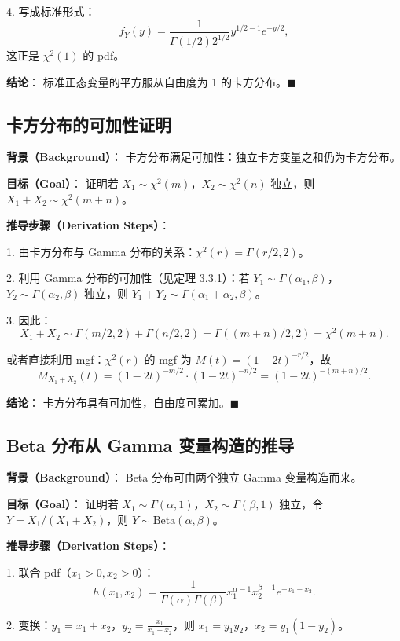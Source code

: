 4. 写成标准形式：
\[
f_Y(y) = \frac{1}{\Gamma(1/2) 2^{1/2}} y^{1/2 - 1} e^{-y/2},
\]
这正是 $\chi^2(1)$ 的 pdf。

\textbf{结论}：
标准正态变量的平方服从自由度为 1 的卡方分布。$\blacksquare$

\subsection{卡方分布的可加性证明}\label{sec:chi-square-additivity}

\textbf{背景（Background）}：
卡方分布满足可加性：独立卡方变量之和仍为卡方分布。

\textbf{目标（Goal）}：
证明若 $X_1 \sim \chi^2(m)$，$X_2 \sim \chi^2(n)$ 独立，则 $X_1 + X_2 \sim \chi^2(m+n)$。

\textbf{推导步骤（Derivation Steps）}：

1. 由卡方分布与 Gamma 分布的关系：$\chi^2(r) = \Gamma(r/2, 2)$。

2. 利用 Gamma 分布的可加性（见定理 3.3.1）：若 $Y_1 \sim \Gamma(\alpha_1, \beta)$，$Y_2 \sim \Gamma(\alpha_2, \beta)$ 独立，则 $Y_1 + Y_2 \sim \Gamma(\alpha_1 + \alpha_2, \beta)$。

3. 因此：
\[
X_1 + X_2 \sim \Gamma(m/2, 2) + \Gamma(n/2, 2) = \Gamma((m+n)/2, 2) = \chi^2(m+n).
\]

或者直接利用 mgf：$\chi^2(r)$ 的 mgf 为 $M(t) = (1-2t)^{-r/2}$，故
\[
M_{X_1+X_2}(t) = (1-2t)^{-m/2} \cdot (1-2t)^{-n/2} = (1-2t)^{-(m+n)/2}.
\]

\textbf{结论}：
卡方分布具有可加性，自由度可累加。$\blacksquare$

\subsection{Beta 分布从 Gamma 变量构造的推导}\label{sec:beta-from-gamma}

\textbf{背景（Background）}：
Beta 分布可由两个独立 Gamma 变量构造而来。

\textbf{目标（Goal）}：
证明若 $X_1 \sim \Gamma(\alpha, 1)$，$X_2 \sim \Gamma(\beta, 1)$ 独立，令 $Y = X_1/(X_1 + X_2)$，则 $Y \sim \text{Beta}(\alpha, \beta)$。

\textbf{推导步骤（Derivation Steps）}：

1. 联合 pdf（$x_1 > 0, x_2 > 0$）：
\[
h(x_1, x_2) = \frac{1}{\Gamma(\alpha)\Gamma(\beta)} x_1^{\alpha-1} x_2^{\beta-1} e^{-x_1 - x_2}.
\]

2. 变换：$y_1 = x_1 + x_2$，$y_2 = \frac{x_1}{x_1+x_2}$，则 $x_1 = y_1 y_2$，$x_2 = y_1(1-y_2)$。

